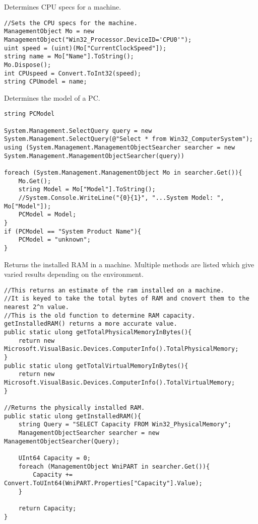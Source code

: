 Determines CPU specs for a machine.
\begin{lstlisting}
//Sets the CPU specs for the machine.
ManagementObject Mo = new ManagementObject("Win32_Processor.DeviceID='CPU0'");
uint speed = (uint)(Mo["CurrentClockSpeed"]);
string name = Mo["Name"].ToString();
Mo.Dispose();
int CPUspeed = Convert.ToInt32(speed);
string CPUmodel = name;
\end{lstlisting}

Determines the model of a PC.
\begin{lstlisting}
string PCModel

System.Management.SelectQuery query = new System.Management.SelectQuery(@"Select * from Win32_ComputerSystem");
using (System.Management.ManagementObjectSearcher searcher = new System.Management.ManagementObjectSearcher(query))

foreach (System.Management.ManagementObject Mo in searcher.Get()){
	Mo.Get();
	string Model = Mo["Model"].ToString();
	//System.Console.WriteLine("{0}{1}", "...System Model: ", Mo["Model"]);
	PCModel = Model;
}
if (PCModel == "System Product Name"){
	PCModel = "unknown";
}
\end{lstlisting}

Returns the installed RAM in a machine. Multiple methods are listed which give varied results depending on the environment.
\begin{lstlisting}
//This returns an estimate of the ram installed on a machine. 
//It is keyed to take the total bytes of RAM and cnovert them to the nearest 2^n value.
//This is the old function to determine RAM capacity. getInstalledRAM() returns a more accurate value.
public static ulong getTotalPhysicalMemoryInBytes(){
	return new Microsoft.VisualBasic.Devices.ComputerInfo().TotalPhysicalMemory;
} 
public static ulong getTotalVirtualMemoryInBytes(){
	return new Microsoft.VisualBasic.Devices.ComputerInfo().TotalVirtualMemory;
}

//Returns the physically installed RAM.
public static ulong getInstalledRAM(){
	string Query = "SELECT Capacity FROM Win32_PhysicalMemory";
	ManagementObjectSearcher searcher = new ManagementObjectSearcher(Query);
	
	UInt64 Capacity = 0;
	foreach (ManagementObject WniPART in searcher.Get()){
		Capacity += Convert.ToUInt64(WniPART.Properties["Capacity"].Value);
	}
	
	return Capacity;
}
\end{lstlisting}


\begin{lstlisting}

\end{lstlisting}


\begin{lstlisting}

\end{lstlisting}


\begin{lstlisting}

\end{lstlisting}


\begin{lstlisting}

\end{lstlisting}
